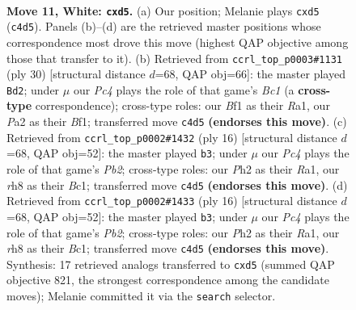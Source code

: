 \documentclass[11pt]{article}
\begin{document}
\clearpage

\begin{figure}[p]\centering
\begin{subfigure}{0.46\textwidth}\centering
\resizebox{\linewidth}{!}{%
\newchessgame
\chessboard[
  setfen={r1b1kbnr/p1p1q1p1/2p5/3pPp1p/2P2P2/1P6/P3Q1PP/RNB1KB1R w KQkq d6 0 11},
  showmover=false,
  pgfstyle=straightmove, color=movearrow, markmove={c4-d5}
]}
\caption{}
\end{subfigure}\hfill
\begin{subfigure}{0.46\textwidth}\centering
\resizebox{\linewidth}{!}{%
\newchessgame
\chessboard[
  setfen={r3kb1r/2pp1ppp/b1n1q3/p1p1P2P/2P5/P4NP1/1P2QP2/R1BK1B1R w kq - 1 16},
  showmover=false,
  pgfstyle=straightmove, color=movearrow, markmove={c1-d2}
]}
\caption{}
\end{subfigure}
\\[4pt]
\begin{subfigure}{0.46\textwidth}\centering
\resizebox{\linewidth}{!}{%
\newchessgame
\chessboard[
  setfen={r3kb1r/p1ppqppp/b1p5/3nP3/2P5/8/PP2QPPP/RNB1KB1R w KQkq - 1 9},
  showmover=false,
  pgfstyle=straightmove, color=movearrow, markmove={b2-b3}
]}
\caption{}
\end{subfigure}\hfill
\begin{subfigure}{0.46\textwidth}\centering
\resizebox{\linewidth}{!}{%
\newchessgame
\chessboard[
  setfen={r3kb1r/p1ppqppp/b1p5/3nP3/2P5/8/PP2QPPP/RNB1KB1R w KQkq - 1 9},
  showmover=false,
  pgfstyle=straightmove, color=movearrow, markmove={b2-b3}
]}
\caption{}
\end{subfigure}
\caption{\textbf{Move 11, White: \texttt{cxd5}.} (a) Our position; Melanie plays \texttt{cxd5} (\texttt{c4d5}). Panels (b)--(d) are the retrieved master positions whose correspondence most drove this move (highest QAP objective among those that transfer to it). (b) Retrieved from \texttt{ccrl\_top\_p0003\#1131} (ply 30) [structural distance $d$=68, QAP obj=66]: the master played \texttt{Bd2}; under $\mu$ our \emph{Pc4} plays the role of that game's \emph{Bc1} (a \textbf{cross-type} correspondence); cross-type roles: our \emph{B}f1 as their \emph{R}a1, our \emph{P}a2 as their \emph{B}f1; transferred move \texttt{c4d5} \textbf{(endorses this move)}. (c) Retrieved from \texttt{ccrl\_top\_p0002\#1432} (ply 16) [structural distance $d$=68, QAP obj=52]: the master played \texttt{b3}; under $\mu$ our \emph{Pc4} plays the role of that game's \emph{Pb2}; cross-type roles: our \emph{P}h2 as their \emph{R}a1, our \emph{r}h8 as their \emph{B}c1; transferred move \texttt{c4d5} \textbf{(endorses this move)}. (d) Retrieved from \texttt{ccrl\_top\_p0002\#1433} (ply 16) [structural distance $d$=68, QAP obj=52]: the master played \texttt{b3}; under $\mu$ our \emph{Pc4} plays the role of that game's \emph{Pb2}; cross-type roles: our \emph{P}h2 as their \emph{R}a1, our \emph{r}h8 as their \emph{B}c1; transferred move \texttt{c4d5} \textbf{(endorses this move)}. Synthesis: 17 retrieved analogs transferred to \texttt{cxd5} (summed QAP objective 821, the strongest correspondence among the candidate moves); Melanie committed it via the \texttt{search} selector.}
\label{fig:thought-m20}
\end{figure}
\end{document}
